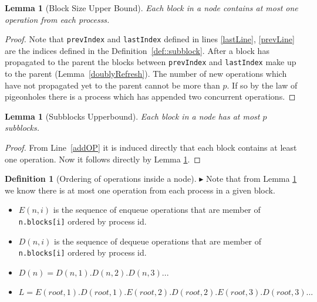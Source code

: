 \documentclass[10pt]{article}
\newtheorem{lemma}[theorem]{Lemma}
\theoremstyle{definition}
\newtheorem{definition}[theorem]{Definition}
\begin{document}
\begin{lemma}[Block Size Upper Bound]\label{blockSize}
Each block in a node contains at most one operation from each processs.  
\end{lemma}
\begin{proof}
  Note that \texttt{prevIndex} and \texttt{lastIndex} defined in lines \ref{lastLine}, \ref{prevLine} are the indices defined in the Definition~\ref{def::subblock}. After a block has propagated to the parent the blocks between \texttt{prevIndex} and \texttt{lastIndex} make up to the parent (Lemma~\ref{doublyRefresh}). The number of new operations which have not propagated yet to the parent cannot be more than $p$. If so by the law of pigeonholes there is a process which has appended two concurrent operations.
\end{proof}

\begin{lemma}[Subblocks Upperbound]\label{subBlocksBound}
Each block in a node  has at most $p$ subblocks.
\end{lemma}
\begin{proof}
  From Line~\ref{addOP} it is induced directly that each block contains at least one operation. Now it follows directly by Lemma \ref{blockSize}.
\end{proof}

\begin{definition} [Ordering of operations inside a node] \label{ordering}
$\blacktriangleright$ Note that from Lemma \ref{blockSize} we know there is at most one operation from each process in a given block.

\begin{itemize}
  \item $E(n,i)$ is the sequence of enqueue operations that are member of \texttt{n.blocks[i]} ordered by process id.
  \item 
$D(n,i)$ is the sequence of dequeue operations that are member of \texttt{n.blocks[i]} ordered by process id.
\item $D(n)=D(n,1).D(n,2).D(n,3)...$
\item $L=E(root,1).D(root,1).E(root,2).D(root,2).E(root,3).D(root,3)...$
\end{itemize}
\end{definition}
\end{document}
